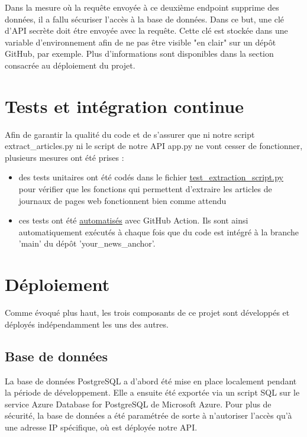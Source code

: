 \documentclass[french]{article}
\begin{document}
    Dans la mesure où la requête envoyée à ce deuxième endpoint supprime des données, il a fallu sécuriser l'accès à la base de données. Dans ce but, une clé d'API secrète doit étre envoyée avec la requête. Cette clé est stockée dans une variable d'environnement afin de ne pas être visible "en clair" sur un dépôt GitHub, par exemple. Plus d'informations sont disponibles dans la section consacrée au déploiement du projet.

    \section{Tests et intégration continue}
    Afin de garantir la qualité du code et de s'assurer que ni notre script extract\_articles.py ni le script de notre API app.py ne vont cesser de fonctionner, plusieurs mesures ont été prises :
    \begin{itemize}
        \item des tests unitaires ont été codés dans le fichier \href{https://github.com/vinpap/your_news_anchor/blob/main/test/test_extraction_script.py}{test\_extraction\_script.py} pour vérifier que les fonctions qui permettent d'extraire les articles de journaux de pages web fonctionnent bien comme attendu
        \item ces tests ont été \href{https://github.com/vinpap/your_news_anchor/blob/main/.github/workflows/main_vincent-your-news-anchor.yml}{automatisés} avec GitHub Action. Ils sont ainsi automatiquement exécutés à chaque fois que du code est intégré à la branche 'main' du dépôt 'your\_news\_anchor'.
    \end{itemize}
    \section{Déploiement}
    Comme évoqué plus haut, les trois composants de ce projet sont développés et déployés indépendamment les uns des autres.
    \subsection{Base de données}
    La base de données PostgreSQL a d'abord été mise en place localement pendant la période de développement. Elle a ensuite été exportée via un script SQL sur le service Azure Database for PostgreSQL de Microsoft Azure. 
    Pour plus de sécurité, la base de données a été paramétrée de sorte à n'autoriser l'accès qu'à une adresse IP spécifique, où est déployée notre API.
\end{document}
